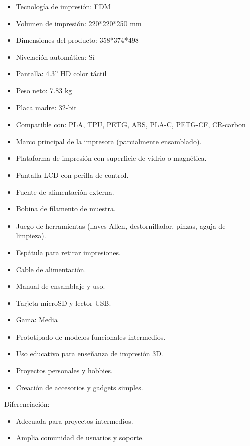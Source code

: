 \documentclass[compacto,5pt,comentarios]{aleph-notas}
\begin{document}
\begin{car}
\begin{itemize}
    \item Tecnología de impresión: FDM
    \item Volumen de impresión: 220*220*250 mm
    \item Dimensiones del producto: 358*374*498
    \item Nivelación automática: Sí
    \item Pantalla: 4.3'' HD color táctil
    \item Peso neto: 7.83 kg
    \item Placa madre: 32-bit
    \item Compatible con: PLA, TPU, PETG, ABS, PLA-C, PETG-CF, CR-carbon
\end{itemize}
\end{car}
\begin{cont}
\begin{itemize}
    \item Marco principal de la impresora (parcialmente ensamblado).
    \item Plataforma de impresión con superficie de vidrio o magnética.
    \item Pantalla LCD con perilla de control.
    \item Fuente de alimentación externa.
    \item Bobina de filamento de muestra.
    \item Juego de herramientas (llaves Allen, destornillador, pinzas, aguja de limpieza).
    \item Espátula para retirar impresiones.
    \item Cable de alimentación.
    \item Manual de ensamblaje y uso.
    \item Tarjeta microSD y lector USB.
\end{itemize}
\end{cont}

\begin{aplic}
\begin{itemize}
    \item Gama: Media
\item Prototipado de modelos funcionales intermedios.
\item Uso educativo para enseñanza de impresión 3D.
\item Proyectos personales y hobbies.
\item Creación de accesorios y gadgets simples.
\end{itemize}

Diferenciación:
\begin{itemize}
    \item Adecuada para proyectos intermedios.
    \item Amplia comunidad de usuarios y soporte.
\end{itemize}

\end{aplic}
\end{document}
